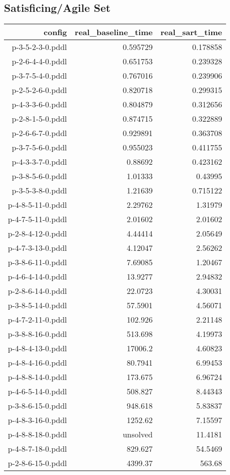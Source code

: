 \documentclass{article}
\begin{document}
                    \subsection*{Satisficing/Agile Set}
                    
                            \begin{center}
                            \scriptsize
                            \begin{tabular}{r|r|r}
                            config & real\_baseline\_time & real\_sart\_time\\\midrule
                             p-3-5-2-3-0.pddl&0.595729&0.178858\\
 p-2-6-4-4-0.pddl&0.651753&0.239328\\
 p-3-7-5-4-0.pddl&0.767016&0.239906\\
 p-2-5-2-6-0.pddl&0.820718&0.299315\\
 p-4-3-3-6-0.pddl&0.804879&0.312656\\
 p-2-8-1-5-0.pddl&0.874715&0.322889\\
 p-2-6-6-7-0.pddl&0.929891&0.363708\\
 p-3-7-5-6-0.pddl&0.955023&0.411755\\
 p-4-3-3-7-0.pddl&0.88692&0.423162\\
 p-3-8-5-6-0.pddl&1.01333&0.43995\\
 p-3-5-3-8-0.pddl&1.21639&0.715122\\
 p-4-8-5-11-0.pddl&2.29762&1.31979\\
 p-4-7-5-11-0.pddl&2.01602&2.01602\\
 p-2-8-4-12-0.pddl&4.44414&2.05649\\
 p-4-7-3-13-0.pddl&4.12047&2.56262\\
 p-3-8-6-11-0.pddl&7.69085&1.20467\\
 p-4-6-4-14-0.pddl&13.9277&2.94832\\
 p-2-8-6-14-0.pddl&22.0723&4.30031\\
 p-3-8-5-14-0.pddl&57.5901&4.56071\\
 p-4-7-2-11-0.pddl&102.926&2.21148\\
 p-3-8-8-16-0.pddl&513.698&4.19973\\
 p-4-8-4-13-0.pddl&17006.2&4.60823\\
 p-4-8-4-16-0.pddl&80.7941&6.99453\\
 p-4-8-8-14-0.pddl&173.675&6.96724\\
 p-4-6-5-14-0.pddl&508.827&8.44343\\
 p-3-8-6-15-0.pddl&948.618&5.83837\\
 p-4-8-3-16-0.pddl&1252.62&7.15597\\
 p-4-8-8-18-0.pddl&unsolved&11.4181\\
 p-4-8-7-18-0.pddl&829.627&54.5469\\
 p-2-8-6-15-0.pddl&4399.37&563.68
                            \end{tabular}
                            \end{center}
                    
\end{document}
